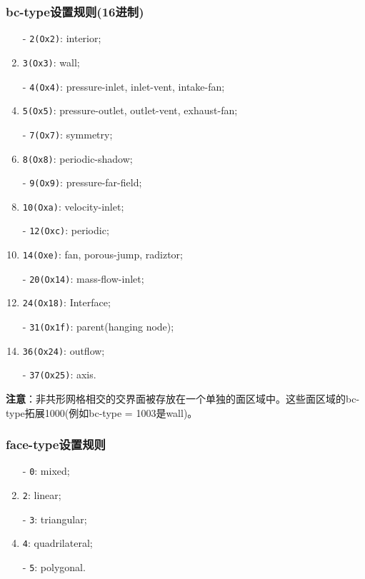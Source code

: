 \documentclass[lang=cn,11pt,a4paper]{elegantpaper} %
\begin{document}
\subsubsection{bc-type设置规则(16进制)}\label{bc-type}
\begin{enumerate}
  \item[-] \lstinline{2(Ox2)}: interior;
  \item[-] \lstinline{3(Ox3)}: wall;
  \item[-] \lstinline{4(Ox4)}: pressure-inlet, inlet-vent, intake-fan;
  \item[-] \lstinline{5(Ox5)}: pressure-outlet, outlet-vent, exhaust-fan;
  \item[-] \lstinline{7(Ox7)}: symmetry;
  \item[-] \lstinline{8(Ox8)}: periodic-shadow;
  \item[-] \lstinline{9(Ox9)}: pressure-far-field;
  \item[-] \lstinline{10(Oxa)}: velocity-inlet;
  \item[-] \lstinline{12(Oxc)}: periodic; 
  \item[-] \lstinline{14(Oxe)}: fan, porous-jump, radiztor;
  \item[-] \lstinline{20(Ox14)}: mass-flow-inlet;
  \item[-] \lstinline{24(Ox18)}: Interface;
  \item[-] \lstinline{31(Ox1f)}: parent(hanging node);
  \item[-] \lstinline{36(Ox24)}: outflow;
  \item[-] \lstinline{37(Ox25)}: axis.
\end{enumerate}

\textbf{注意}：非共形网格相交的交界面被存放在一个单独的面区域中。这些面区域的bc-type拓展1000(例如bc-type = 1003是wall)。

\subsubsection{face-type设置规则}\label{face-type}
\begin{enumerate}
  \item[-] \lstinline{0}: mixed;
  \item[-] \lstinline{2}: linear;
  \item[-] \lstinline{3}: triangular;
  \item[-] \lstinline{4}: quadrilateral;
  \item[-] \lstinline{5}: polygonal.
\end{enumerate}
\end{document}
